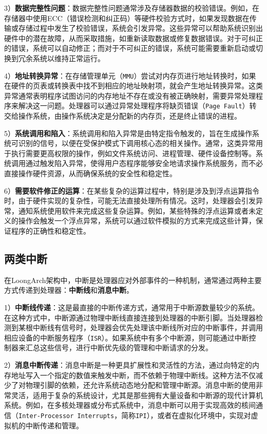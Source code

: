 3）\textbf{数据完整性问题}：数据完整性问题通常涉及存储器数据的校验错误。例如，在存储器中使用ECC（错误检测和纠正码）等硬件校验方式时，如果发现数据在传输或存储过程中发生了校验错误，系统会引发异常。这些异常可以帮助系统识别出硬件中的潜在故障，从而采取措施，如重新读取数据或修复数据错误。对于可纠正的错误，系统可以自动修正；而对于不可纠正的错误，系统可能需要重新启动或切换到冗余系统以维持正常运行。

4）\textbf{地址转换异常}：在存储管理单元（\texttt{MMU}）尝试对内存页进行地址转换时，如果在硬件的页表或转换表中找不到相应的地址映射项，就会产生地址转换异常。这类异常通常表明程序试图访问的内存地址不存在或没有被正确映射，需要异常处理程序来解决这一问题。处理器可以通过异常处理程序将缺页错误（\texttt{Page\ Fault}）转交给操作系统，由操作系统决定是分配新的内存页，还是终止错误的进程。

5）\textbf{系统调用和陷入}：系统调用和陷入异常是由特定指令触发的，旨在生成操作系统可识别的信号，以便在受保护模式下调用核心态的相关操作。通常，这类异常用于执行需要更高权限的操作，例如文件系统访问、进程管理、硬件设备控制等。系统调用通过触发陷入异常，使得用户态程序能够安全地请求操作系统服务，而不必直接操作硬件资源，从而确保系统的安全性和稳定性。

6）\textbf{需要软件修正的运算}：在某些复杂的运算过程中，特别是涉及到浮点运算指令时，由于硬件实现的复杂性，可能无法直接处理所有情况。这时，处理器会引发异常，通知系统使用软件来完成这些复杂运算。例如，某些特殊的浮点运算或者未定义的操作会触发一个浮点异常，系统可以通过软件模拟的方式来完成这些计算，保证程序的正确性和稳定性。

\subsection{两类中断}\label{sec:07-exceptions-007}

在LoongArch架构中，中断是处理器应对外部事件的一种机制，通常通过两种主要方式传递到处理器：\textbf{中断线}和\textbf{消息中断}。

1）\textbf{中断线传递}：这是最直接的中断传递方式，通常用于中断源数量较少的系统。在这种方式中，中断源通过物理中断线直接连接到处理器的中断引脚。当处理器检测到某根中断线有信号时，处理器会优先处理该中断线所对应的中断事件，并调用相应设备的中断服务程序（\texttt{ISR}）。如果系统中有多个中断源，则可能通过中断控制器来汇总这些信号，进行中断优先级的管理和中断请求的分发。

2）\textbf{消息中断传递}：消息中断是一种更具扩展性和灵活性的方法，通过向特定的内存地址写入一个指定的数值来触发中断，而不依赖于物理中断线。这种方法不仅减少了对物理引脚的依赖，还允许系统动态地分配和管理中断源。消息中断的使用非常灵活，适用于复杂的系统设计，尤其是那些拥有大量设备和中断源的现代计算机系统。例如，在多核处理器或分布式系统中，消息中断可以用于实现高效的核间通信（\texttt{Inter-Processor\ Interrupts}，简称\texttt{IPI}），或者在虚拟化环境中，实现对虚拟机的中断传递和管理。


